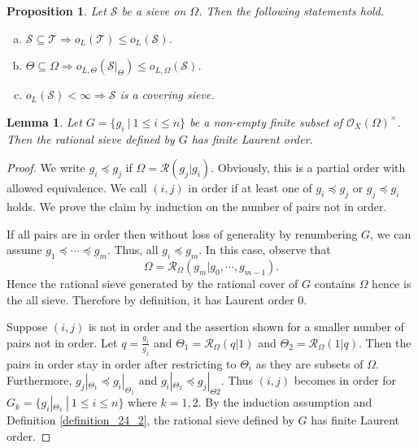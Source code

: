 \documentclass[8pt]{article}
\numberwithin{equation}{section}
\newtheorem{proposition}{Proposition}[subsection]
\newtheorem{lemma}{Lemma}[subsection]
\newcommand{\cR}[0]{\mathcal{R}}
\newcommand{\sep}[0]{\:|\:}
\newcommand{\sS}[0]{\mathscr{S}}
\newcommand{\cO}[0]{\mathcal{O}}
\begin{document}
\begin{proposition}
    \label{fact_24_1}Let $\sS$ be a sieve on $\Omega$. Then the following statements hold.
    \begin{enumerate}[a.]
        \item $\sS\subseteq\mathcal{T}\Rightarrow o_L(\mathcal{T})\leq o_L(\sS)$. 
        \item $\Theta\subseteq\Omega\Rightarrow o_{L,\Theta}(\sS|_\Theta)\leq o_{L,\Omega}(\sS)$.
        \item $o_L(\sS)<\infty\Rightarrow \sS$ is a covering sieve.
    \end{enumerate}
\end{proposition}


\begin{lemma}
    \label{lemma_24_1}
    Let $G=\{g_i\sep 1\leq i\leq n\}$ be a non-empty finite subset of $\cO_X(\Omega)^\times$. %
    Then the rational sieve defined by $G$ has finite Laurent order.
\end{lemma}
\begin{proof}
    We write $g_i\preceq g_j$ if $\Omega=\cR(g_j|g_i)$. Obviously, this is a partial order with allowed equivalence. We call $(i,j)$ in order if at least one of $g_i\preceq g_j$ or $g_j\preceq g_i$ holds. 
    We prove the claim by induction on the number of pairs not in order. 
    \par If all pairs are in order then without loss of generality by renumbering $G$, we can assume $g_1\preceq \cdots\preceq g_m$. Thus, all $g_i\preceq g_m$. In this case, observe that 
    \begin{equation*}
    \Omega = \cR_\Omega(g_m|g_0,\cdots,g_{m-1}).
    \end{equation*}
    Hence the rational sieve generated by the rational cover of $G$ contains $\Omega$ hence is the all sieve. Therefore by definition, it has Laurent order $0$.
    \par Suppose $(i,j)$ is not in order and the assertion shown for a smaller number of pairs not in order. Let $q ={\frac {g_i} {g_j}}$ and $\Theta_1 = \cR_\Omega(q|1)$ and $\Theta_2=\cR_\Omega(1|q)$. Then the pairs in order stay in order after restricting to $\Theta_i$ as they are subsets of $\Omega$. Furthermore, $g_j|_{\Theta_1}\preceq g_i|_{\Theta_1}$ and $g_i|_{\Theta_2}\preceq g_j|_{\Theta2}$.
    Thus $(i,j)$ becomes in order for $G_k = \{g_i|_{\Theta_k}\sep 1\leq i\leq n\}$ where $k=1,2$. By the induction assumption and Definition \ref{definition_24_2}, the rational sieve defined by $G$ has finite Laurent order.
\end{proof}
\end{document}
